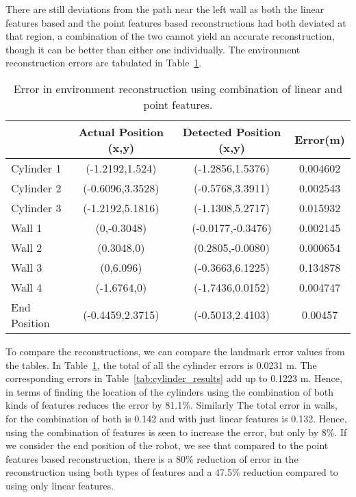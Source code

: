 There are still deviations from the path near the left wall as both the linear features based and the point features based reconstructions had both deviated at that region, a combination of the two cannot yield an accurate reconstruction, though it can be better than either one individually. The environment reconstruction errors are tabulated in Table~\ref{tab:combo_results}.

\begin{table}
\caption{Error in environment reconstruction using combination of linear and point features.}
\label{tab:combo_results}
\begin{tabular}{| l | c | c | c |}
\hline ~ & Actual Position (x,y) & Detected Position (x,y) & Error(m)\\
\hline Cylinder 1 & (-1.2192,1.524) & (-1.2856,1.5376) & 0.004602 \\ 
\hline Cylinder 2 & (-0.6096,3.3528) & (-0.5768,3.3911) & 0.002543 \\ 
\hline Cylinder 3 & (-1.2192,5.1816) & (-1.1308,5.2717) & 0.015932 \\
\hline Wall 1 & (0,-0.3048) & (-0.0177,-0.3476) & 0.002145 \\ 
\hline Wall 2 & (0.3048,0) & (0.2805,-0.0080) & 0.000654 \\ 
\hline Wall 3 & (0,6.096) & (-0.3663,6.1225) & 0.134878 \\ 
\hline Wall 4 & (-1.6764,0) & (-1.7436,0.0152) & 0.004747 \\
\hline End Position & (-0.4459,2.3715) & (-0.5013,2.4103) & 0.00457 \\
\hline 
\end{tabular} 
\end{table}

To compare the reconstructions, we can compare the landmark error values from the tables. In Table~\ref{tab:combo_results}, the total of all the cylinder errors is 0.0231 m. The corresponding errors in Table~\ref{tab:cylinder_results} add up to 0.1223 m. Hence, in terms of finding the location of the cylinders using the combination of both kinds of features reduces the error by 81.1\%. Similarly The total error in walls, for the combination of both is 0.142 and with just linear features is 0.132. Hence, using the combination of features is seen to increase the error, but only by 8\%. If we consider the end position of the robot, we see that compared to the point features based reconstruction, there is a 80\% reduction of error in the reconstruction using both types of features and a 47.5\% reduction compared to using only linear features. 


